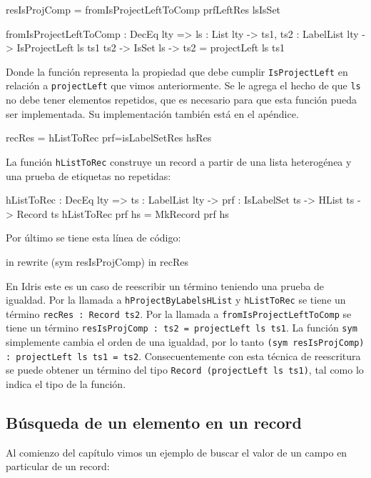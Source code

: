 \begin{code}
resIsProjComp = fromIsProjectLeftToComp prfLeftRes lsIsSet

fromIsProjectLeftToComp : DecEq lty => {ls : List lty} ->
  {ts1, ts2 : LabelList lty} -> IsProjectLeft ls ts1 ts2 ->
  IsSet ls -> ts2 = projectLeft ls ts1
\end{code}

Donde la función representa la propiedad que debe cumplir \texttt{IsProjectLeft} en relación a \texttt{projectLeft} que vimos anteriormente. Se le agrega el hecho de que \texttt{ls} no debe tener elementos repetidos, que es necesario para que esta función pueda ser implementada. Su implementación también está en el apéndice.

\begin{code}
recRes = hListToRec {prf=isLabelSetRes} hsRes
\end{code}

La función \texttt{hListToRec} construye un record a partir de una lista heterogénea y una prueba de etiquetas no repetidas:

\begin{code}
hListToRec : DecEq lty => {ts : LabelList lty} ->
  {prf : IsLabelSet ts} -> HList ts -> Record ts
hListToRec {prf} hs = MkRecord prf hs
\end{code}

Por último se tiene esta línea de código:

\begin{code}
in rewrite (sym resIsProjComp) in recRes
\end{code}

En Idris este es un caso de reescribir un término teniendo una prueba de igualdad. Por la llamada a \texttt{hProjectByLabelsHList} y \texttt{hListToRec} se tiene un término \texttt{recRes : Record ts2}. Por la llamada a \texttt{fromIsProjectLeftToComp} se tiene un término \texttt{resIsProjComp : ts2 = projectLeft ls ts1}. La función \texttt{sym} simplemente cambia el orden de una igualdad, por lo tanto \texttt{(sym resIsProjComp) : projectLeft ls ts1 = ts2}. Consecuentemente con esta técnica de reescritura se puede obtener un término del tipo \texttt{Record (projectLeft ls ts1)}, tal como lo indica el tipo de la función.

\subsection{Búsqueda de un elemento en un record}

Al comienzo del capítulo vimos un ejemplo de buscar el valor de un campo en particular de un record:

